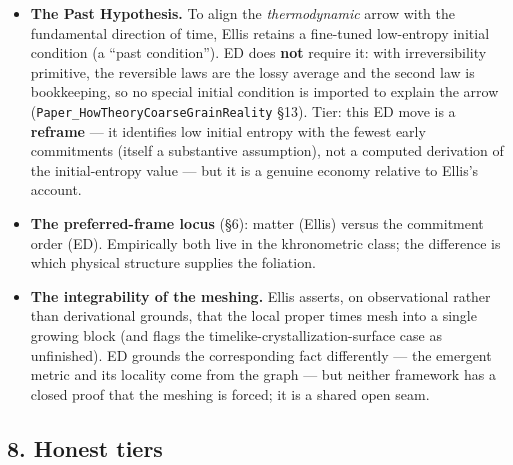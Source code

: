 \documentclass[
  11pt,
]{article}
\providecommand{\tightlist}{%
  \setlength{\itemsep}{0pt}\setlength{\parskip}{0pt}}
\providecommand{\tightlist}{}
\begin{document}
\begin{itemize}
\tightlist
\item
  \textbf{The Past Hypothesis.} To align the \emph{thermodynamic} arrow
  with the fundamental direction of time, Ellis retains a fine-tuned
  low-entropy initial condition (a ``past condition''). ED does
  \textbf{not} require it: with irreversibility primitive, the
  reversible laws are the lossy average and the second law is
  bookkeeping, so no special initial condition is imported to explain
  the arrow (\texttt{Paper\_HowTheoryCoarseGrainReality} §13). Tier:
  this ED move is a \textbf{reframe} --- it identifies low initial
  entropy with the fewest early commitments (itself a substantive
  assumption), not a computed derivation of the initial-entropy value
  --- but it is a genuine economy relative to Ellis's account.
\item
  \textbf{The preferred-frame locus} (§6): matter (Ellis) versus the
  commitment order (ED). Empirically both live in the khronometric
  class; the difference is which physical structure supplies the
  foliation.
\item
  \textbf{The integrability of the meshing.} Ellis asserts, on
  observational rather than derivational grounds, that the local proper
  times mesh into a single growing block (and flags the
  timelike-crystallization-surface case as unfinished). ED grounds the
  corresponding fact differently --- the emergent metric and its
  locality come from the graph --- but neither framework has a closed
  proof that the meshing is forced; it is a shared open seam.
\end{itemize}

\subsection{8. Honest tiers}\label{honest-tiers}
\end{document}
